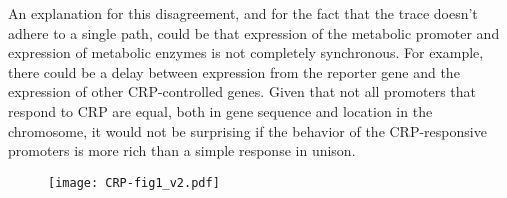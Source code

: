 {An explanation for this disagreement, and for the fact that the trace doesn't adhere to a single path, 
could be that
expression of the metabolic promoter and expression of metabolic enzymes is not 
completely synchronous.
%
For example, there could be a delay between expression from the reporter gene and the expression of other CRP-controlled genes.
%
Given that not all promoters that respond to CRP are equal, both in gene sequence and location in the chromosome,
it would not be surprising if the behavior of the CRP-responsive promoters is more rich
than a simple response in unison.
}


%
%



\begin{figure}
	\centering
	\texttt{[image: CRP-fig1\_v2.pdf]}
	\clearpage %
\end{figure}	

\clearpage

